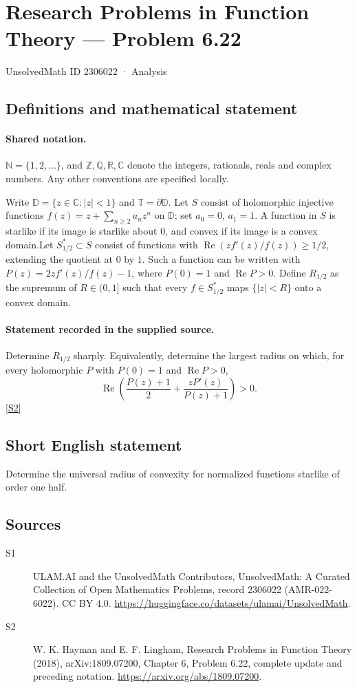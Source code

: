 \documentclass[11pt]{article}
\newcommand{\sref}[2]{\hyperlink{source:#1:#2}{[S#2]}}
\begin{document}
\setcounter{section}{2306021}
\section{Research Problems in Function Theory — Problem 6.22}\label{2306022}
{\small\sffamily UnsolvedMath ID 2306022 · Analysis}
\subsection{Definitions and mathematical statement}

\paragraph{Shared notation.}$\mathbb N=\{1,2,\ldots\}$, and $\mathbb Z,\mathbb Q,\mathbb R,\mathbb C$ denote the integers, rationals, reals and complex numbers. Any other conventions are specified locally.


Write $\mathbb D=\{z\in\mathbb C:|z|<1\}$ and $\mathbb T=\partial\mathbb D$. Let $S$ consist of holomorphic injective functions $f(z)=z+\sum_{n\ge2}a_nz^n$ on $\mathbb D$; set $a_0=0$, $a_1=1$. A function in $S$ is starlike if its image is starlike about $0$, and convex if its image is a convex domain.Let $S_{1/2}^*\subset S$ consist of functions with $\operatorname{Re}(zf'(z)/f(z))\ge1/2$, extending the quotient at $0$ by $1$. Such a function can be written with $P(z)=2zf'(z)/f(z)-1$, where $P(0)=1$ and $\operatorname{Re}P>0$. Define $R_{1/2}$ as the supremum of $R\in(0,1]$ such that every $f\in S_{1/2}^*$ maps $\{|z|<R\}$ onto a convex domain.
\paragraph{Statement recorded in the supplied source.}
Determine $R_{1/2}$ sharply. Equivalently, determine the largest radius on which, for every holomorphic $P$ with $P(0)=1$ and $\operatorname{Re}P>0$,
\[\operatorname{Re}\left(\frac{P(z)+1}{2}+\frac{zP'(z)}{P(z)+1}\right)>0.\] \sref{2306022}{2}
\subsection{Short English statement}
Determine the universal radius of convexity for normalized functions starlike of order one half.
\subsection{Sources}
\begin{description}
\item[\hypertarget{source:2306022:1}{S1}] ULAM.AI and the UnsolvedMath Contributors, UnsolvedMath: A Curated Collection of Open Mathematics Problems, record 2306022 (AMR-022-6022). CC BY 4.0. \url{https://huggingface.co/datasets/ulamai/UnsolvedMath}.
\item[\hypertarget{source:2306022:2}{S2}] W. K. Hayman and E. F. Lingham, Research Problems in Function Theory (2018), arXiv:1809.07200, Chapter 6, Problem 6.22, complete update and preceding notation. \url{https://arxiv.org/abs/1809.07200}.
\end{description}
\label{end:2306022}
\end{document}
